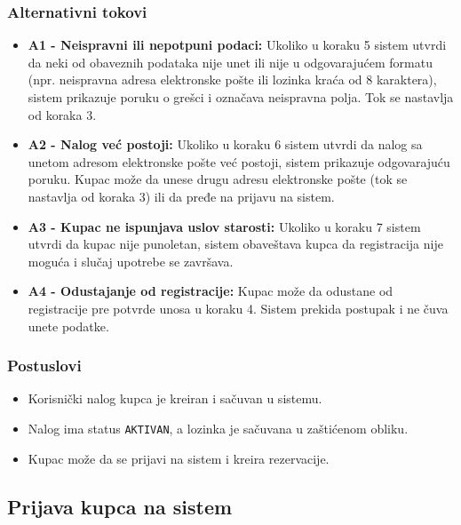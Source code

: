 \documentclass[a4paper,12pt]{article}
\begin{document}
\subsubsection{Alternativni tokovi}

\begin{itemize}
    \item \textbf{A1 - Neispravni ili nepotpuni podaci:}
    Ukoliko u koraku 5 sistem utvrdi da neki od obaveznih podataka nije unet ili nije u odgovarajućem formatu (npr. neispravna adresa elektronske pošte ili lozinka kraća od 8 karaktera), sistem prikazuje poruku o grešci i označava neispravna polja. Tok se nastavlja od koraka 3.

    \item \textbf{A2 - Nalog već postoji:}
    Ukoliko u koraku 6 sistem utvrdi da nalog sa unetom adresom elektronske pošte već postoji, sistem prikazuje odgovarajuću poruku. Kupac može da unese drugu adresu elektronske pošte (tok se nastavlja od koraka 3) ili da pređe na prijavu na sistem.

    \item \textbf{A3 - Kupac ne ispunjava uslov starosti:}
    Ukoliko u koraku 7 sistem utvrdi da kupac nije punoletan, sistem obaveštava kupca da registracija nije moguća i slučaj upotrebe se završava.

    \item \textbf{A4 - Odustajanje od registracije:}
    Kupac može da odustane od registracije pre potvrde unosa u koraku 4. Sistem prekida postupak i ne čuva unete podatke.
\end{itemize}

\subsubsection{Postuslovi}

\begin{itemize}
    \item Korisnički nalog kupca je kreiran i sačuvan u sistemu.
    \item Nalog ima status \texttt{AKTIVAN}, a lozinka je sačuvana u zaštićenom obliku.
    \item Kupac može da se prijavi na sistem i kreira rezervacije.
\end{itemize}

\newpage

\subsection{Prijava kupca na sistem}
\end{document}
